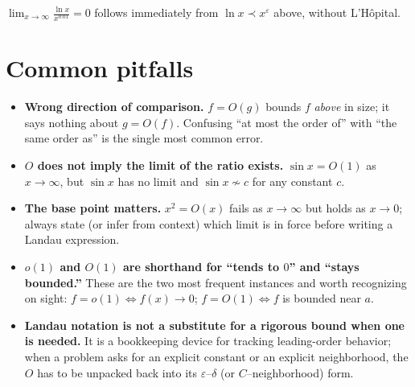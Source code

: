 \documentclass{essay}
\begin{document}
\begin{example}
  \(\displaystyle\lim_{x\to\infty}\frac{\ln x}{x^{0.01}} = 0\) follows immediately from \(\ln x \prec x^{\varepsilon}\) above, without L'Hôpital.
\end{example}

\section{Common pitfalls}

\begin{itemize}
  \item \textbf{Wrong direction of comparison.} \(f=O(g)\) bounds \(f\) \emph{above} in size; it says nothing about \(g=O(f)\). Confusing ``at most the order of'' with ``the same order as'' is the single most common error.
  \item \textbf{\(O\) does not imply the limit of the ratio exists.} \(\sin x = O(1)\) as \(x\to\infty\), but \(\sin x\) has no limit and \(\sin x \not\sim c\) for any constant \(c\).
  \item \textbf{The base point matters.} \(x^{2} = O(x)\) fails as \(x\to\infty\) but holds as \(x\to 0\); always state (or infer from context) which limit is in force before writing a Landau expression.
  \item \textbf{\(o(1)\) and \(O(1)\) are shorthand for ``tends to \(0\)'' and ``stays bounded.''} These are the two most frequent instances and worth recognizing on sight: \(f=o(1) \iff f(x)\to 0\); \(f=O(1) \iff f\) is bounded near \(a\).
  \item \textbf{Landau notation is not a substitute for a rigorous bound when one is needed.} It is a bookkeeping device for tracking leading-order behavior; when a problem asks for an explicit constant or an explicit neighborhood, the \(O\) has to be unpacked back into its \(\varepsilon\)--\(\delta\) (or \(C\)--neighborhood) form.
\end{itemize}
\end{document}
